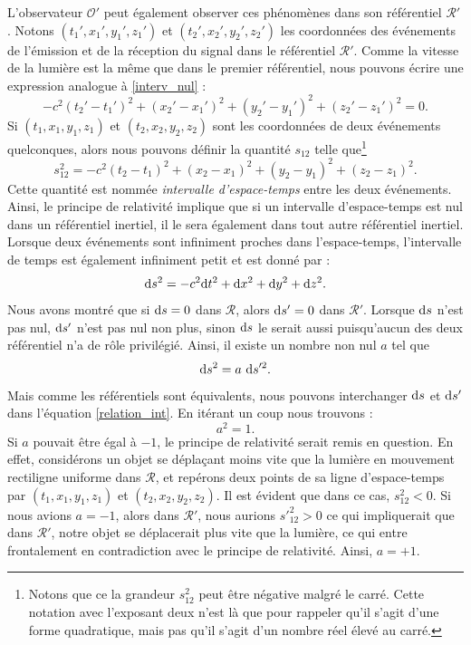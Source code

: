 		L'observateur $\mathscr{O}'$ peut également observer ces phénomènes dans son référentiel $\mathscr{R}'$. Notons $(t_1',x_1',y_1',z_1')$ et $(t_2',x_2',y_2',z_2')$ les coordonnées des événements de l'émission et de la réception du signal dans le référentiel $\mathscr{R}'$. Comme la vitesse de la lumière est la même que dans le premier référentiel, nous pouvons écrire une expression analogue à \eqref{interv_nul} :
		\begin{equation}
			-c^2(t_2'-t_1')^2+(x_2'-x_1')^2+(y_2'-y_1')^2+(z_2'-z_1')^2=0.
		\end{equation}
		Si $(t_1,x_1,y_1,z_1)$ et $(t_2,x_2,y_2,z_2)$ sont les coordonnées de deux événements quelconques, alors nous pouvons définir la quantité $s_{12}$ telle que\footnote{Notons que ce la grandeur $s_{12}^2$ peut être négative malgré le carré. Cette notation avec l'exposant deux n'est là que pour rappeler qu'il s'agit d'une forme quadratique, mais pas qu'il s'agit d'un nombre réel élevé au carré.}
		\begin{equation}
			s_{12}^2=-c^2(t_2-t_1)^2+(x_2-x_1)^2+(y_2-y_1)^2+(z_2-z_1)^2. \label{intervalle}
		\end{equation}
		Cette quantité est nommée \emph{intervalle d'espace-temps} entre les deux événements. Ainsi, le principe de relativité implique que si un intervalle d'espace-temps est nul dans un référentiel inertiel, il le sera également dans tout autre référentiel inertiel. Lorsque deux événements sont infiniment proches dans l'espace-temps, l'intervalle de temps est également infiniment petit et est donné par :
		\begin{equation}
			\mathrm{d} s^2=-c^2\mathrm{d} t^2 + \mathrm{d} x^2+\mathrm{d} y^2+\mathrm{d} z^2.
		\end{equation}
		Nous avons montré que si $\mathrm{d} s=0$ dans $\mathscr{R}$, alors $\mathrm{d} s'=0$ dans $\mathscr{R}'$. Lorsque $\mathrm{d} s$ n'est pas nul, $\mathrm{d} s'$ n'est pas nul non plus, sinon $\mathrm{d} s$ le serait aussi puisqu'aucun des deux référentiel n'a de rôle privilégié. Ainsi, il existe un nombre non nul $a$ tel que
		\begin{equation}
			\mathrm{d} s^2 = a\  \mathrm{d} s'^2. \label{relation_int}
		\end{equation}
		Mais comme les référentiels sont équivalents, nous pouvons interchanger $\mathrm{d} s$ et $\mathrm{d} s'$ dans l'équation \eqref{relation_int}. En itérant un coup nous trouvons :
		\begin{equation}
			a^2=1.
		\end{equation}
		Si $a$ pouvait être égal à $-1$, le principe de relativité serait remis en question. En effet, considérons un objet se déplaçant moins vite que la lumière en mouvement rectiligne uniforme dans $\mathscr{R}$, et repérons deux points de sa ligne d'espace-temps par $(t_1,x_1,y_1,z_1)$ et $(t_2,x_2,y_2,z_2)$. Il est évident que dans ce cas, $s_{12}^2<0$. Si nous avions $a=-1$, alors dans $\mathscr{R}'$, nous aurions $s'_{12}^2>0$ ce qui impliquerait que dans $\mathscr{R}'$, notre objet se déplacerait plus vite que la lumière, ce qui entre frontalement en contradiction avec le principe de relativité. Ainsi, $a=+1$. 

